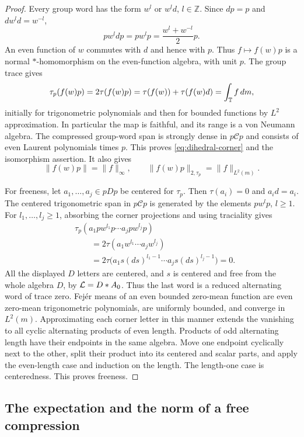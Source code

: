 \begin{proof}
Every group word has the form $w^l$ or $w^ld$, $l\in\mathbb Z$.
Since $dp=p$ and $dw^ld=w^{-l}$,
\[
  pw^ldp=pw^lp=\frac{w^l+w^{-l}}2p.
\]
An even function of $w$ commutes with $d$ and hence with $p$. Thus
$f\mapsto f(w)p$ is a normal $*$-homomorphism on the even-function
algebra, with unit $p$. The group trace gives
\[
  \tau_p(f(w)p)
      =2\tau(f(w)p)=\tau(f(w))+\tau(f(w)d)=\int_{\mathbb T}f\,dm,
\]
initially for trigonometric polynomials and then for bounded functions
by $L^2$ approximation. In particular the map is faithful, and its
range is a von Neumann algebra. The compressed group-word span is
strongly dense in $p\mathcal C p$ and consists of even Laurent
polynomials times $p$. This proves \eqref{eq:dihedral-corner} and the
isomorphism assertion. It also gives
\[
  \|f(w)p\|=\|f\|_\infty,\qquad
  \|f(w)p\|_{2,\tau_p}=\|f\|_{L^2(m)}.
\]

For freeness, let $a_1,\ldots,a_j\in pDp$ be centered for $\tau_p$.
Then $\tau(a_i)=0$ and $a_id=a_i$. The centered trigonometric span in
$p\mathcal C p$ is generated by the elements $pw^lp$, $l\ge1$.
For $l_1,\ldots,l_j\ge1$, absorbing the corner projections and using
traciality gives
\begin{align*}
 &\tau_p(a_1pw^{l_1}p\cdots a_jpw^{l_j}p)\\
 &\qquad=2\tau(a_1w^{l_1}\cdots a_jw^{l_j})\\
 &\qquad=2\tau\big(a_1s(ds)^{l_1-1}\cdots
                              a_js(ds)^{l_j-1}\big)=0.
\end{align*}
All the displayed $D$ letters are centered, and $s$ is centered and
free from the whole algebra $D$, by $\mathcal L=D*A_0$. Thus the last word is
a reduced alternating word of trace zero. Fej\'er means of an even
bounded zero-mean function are even zero-mean trigonometric polynomials,
are uniformly bounded, and converge in $L^2(m)$. Approximating each
corner letter in this manner extends the vanishing to all cyclic
alternating products of even length. Products of odd alternating
length have their endpoints in the same algebra. Move one endpoint
cyclically next to the other, split their product into its centered and
scalar parts, and apply the even-length case and induction on the
length. The length-one case is centeredness. This proves freeness.
\end{proof}

\subsection{The expectation and the norm of a free compression}

